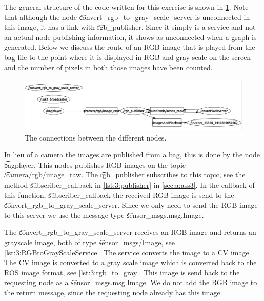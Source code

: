 The general structure of the code written for this exercise is shown in \cref{fig:3:structure}. Note that although the node \t{convert_rgb_to_gray_scale_server} is unconnected in this image, it has a link with \t{rgb_publisher}. Since it simply is a service and not an actual node publishing information, it shows as unconnected when a graph is generated. Below we discuss the route of an RGB image that is played from the bag file to the point where it is displayed in RGB and gray scale on the screen and the number of pixels in both those images have been counted. 



\begin{figure}
	\centering
	\includegraphics[width=\textwidth]{./img/3_structure}
	\caption{The connections between the different nodes.}
	\label{fig:3:structure}
\end{figure}

In lieu of a camera the images are published from a bag, this is done by the node \t{bagplayer}. This nodes publishes RGB images on the topic \t{/camera/rgb/image_raw}. The \t{rgb_publisher} subscribes to this topic, see the method \t{subscriber_callback} in \cref{lst:3:publisher} in \cref{sec:a:ass3}. In the callback of this function, \t{subscriber_callback} the received RGB image is send to the \t{convert_rgb_to_gray_scale_server}. Since we only need to send the RGB image to this server we use the message type \t{sensor_msgs.msg.Image}. 

The \t{convert_rgb_to_gray_scale_server} receives an RGB image and returns an grayscale image, both of type \t{sensor_msgs/Image}, see \cref{lst:3:RGBtoGrayScaleService}. The service converts the image to a CV image. The CV image is converted to a gray scale image which is converted back to the ROS image format, see \cref{lst:3:rgb_to_gray}. This image is send back to the requesting node as a \t{sensor_msgs.msg.Image}. We do not add the RGB image to the return message, since the requesting node already has this image. 



